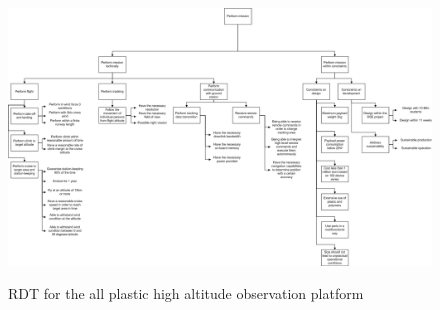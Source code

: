 \documentclass[a4paper]{report}
\begin{document}
\begin{figure}
\includegraphics[width = \textwidth]{Figures/rdt.png}
\label{fig:RDT}
\caption{RDT for the all plastic high altitude observation platform}
\end{figure}
\end{document}
